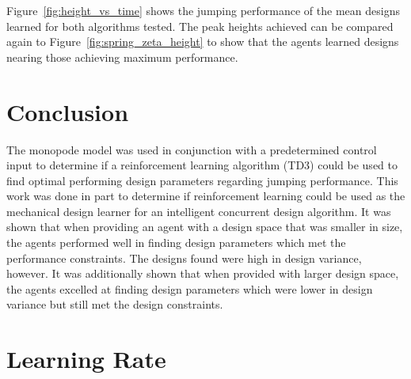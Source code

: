 \documentclass[10pt,twocolumn,letterpaper]{article}
\begin{document}
Figure~\ref{fig:height_vs_time} shows the jumping performance of the mean designs learned for both algorithms tested. The peak heights achieved can be compared again to Figure~\ref{fig:spring_zeta_height} to show that the agents learned designs nearing those achieving maximum performance.


\section{Conclusion}
\label{sec:conclusion}
The monopode model was used in conjunction with a predetermined control input to determine if a reinforcement learning algorithm (TD3) could be used to find optimal performing design parameters regarding jumping performance. This work was done in part to determine if reinforcement learning could be used as the mechanical design learner for an intelligent concurrent design algorithm. It was shown that when providing an agent with a design space that was smaller in size, the agents performed well in finding design parameters which met the performance constraints. The designs found were high in design variance, however. It was additionally shown that when provided with larger design space, the agents excelled at finding design parameters which were lower in design variance but still met the design constraints.


{\small


}

\appendix
\section{Learning Rate}
\label{app:lr_changes}
\end{document}
